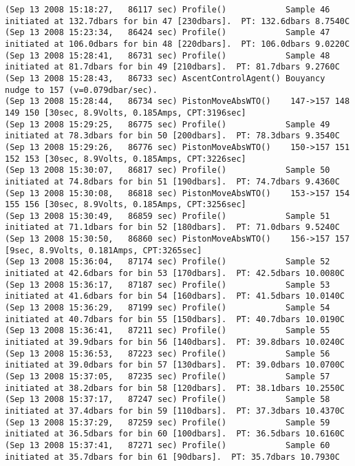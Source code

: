 {\begin{verbatim}
(Sep 13 2008 15:18:27,   86117 sec) Profile()            Sample 46 initiated at 132.7dbars for bin 47 [230dbars].  PT: 132.6dbars 8.7540C
(Sep 13 2008 15:23:34,   86424 sec) Profile()            Sample 47 initiated at 106.0dbars for bin 48 [220dbars].  PT: 106.0dbars 9.0220C
(Sep 13 2008 15:28:41,   86731 sec) Profile()            Sample 48 initiated at 81.7dbars for bin 49 [210dbars].  PT: 81.7dbars 9.2760C
(Sep 13 2008 15:28:43,   86733 sec) AscentControlAgent() Bouyancy nudge to 157 (v=0.079dbar/sec).
(Sep 13 2008 15:28:44,   86734 sec) PistonMoveAbsWTO()    147->157 148 149 150 [30sec, 8.9Volts, 0.185Amps, CPT:3196sec]
(Sep 13 2008 15:29:25,   86775 sec) Profile()            Sample 49 initiated at 78.3dbars for bin 50 [200dbars].  PT: 78.3dbars 9.3540C
(Sep 13 2008 15:29:26,   86776 sec) PistonMoveAbsWTO()    150->157 151 152 153 [30sec, 8.9Volts, 0.185Amps, CPT:3226sec]
(Sep 13 2008 15:30:07,   86817 sec) Profile()            Sample 50 initiated at 74.8dbars for bin 51 [190dbars].  PT: 74.7dbars 9.4360C
(Sep 13 2008 15:30:08,   86818 sec) PistonMoveAbsWTO()    153->157 154 155 156 [30sec, 8.9Volts, 0.185Amps, CPT:3256sec]
(Sep 13 2008 15:30:49,   86859 sec) Profile()            Sample 51 initiated at 71.1dbars for bin 52 [180dbars].  PT: 71.0dbars 9.5240C
(Sep 13 2008 15:30:50,   86860 sec) PistonMoveAbsWTO()    156->157 157 [9sec, 8.9Volts, 0.181Amps, CPT:3265sec]
(Sep 13 2008 15:36:04,   87174 sec) Profile()            Sample 52 initiated at 42.6dbars for bin 53 [170dbars].  PT: 42.5dbars 10.0080C
(Sep 13 2008 15:36:17,   87187 sec) Profile()            Sample 53 initiated at 41.6dbars for bin 54 [160dbars].  PT: 41.5dbars 10.0140C
(Sep 13 2008 15:36:29,   87199 sec) Profile()            Sample 54 initiated at 40.7dbars for bin 55 [150dbars].  PT: 40.7dbars 10.0190C
(Sep 13 2008 15:36:41,   87211 sec) Profile()            Sample 55 initiated at 39.9dbars for bin 56 [140dbars].  PT: 39.8dbars 10.0240C
(Sep 13 2008 15:36:53,   87223 sec) Profile()            Sample 56 initiated at 39.0dbars for bin 57 [130dbars].  PT: 39.0dbars 10.0700C
(Sep 13 2008 15:37:05,   87235 sec) Profile()            Sample 57 initiated at 38.2dbars for bin 58 [120dbars].  PT: 38.1dbars 10.2550C
(Sep 13 2008 15:37:17,   87247 sec) Profile()            Sample 58 initiated at 37.4dbars for bin 59 [110dbars].  PT: 37.3dbars 10.4370C
(Sep 13 2008 15:37:29,   87259 sec) Profile()            Sample 59 initiated at 36.5dbars for bin 60 [100dbars].  PT: 36.5dbars 10.6160C
(Sep 13 2008 15:37:41,   87271 sec) Profile()            Sample 60 initiated at 35.7dbars for bin 61 [90dbars].  PT: 35.7dbars 10.7930C

\end{verbatim}}

